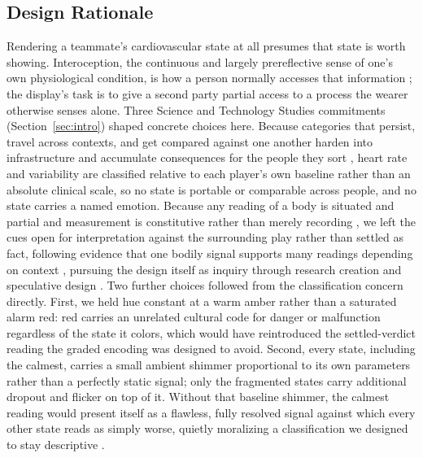 \documentclass[manuscript,review,anonymous]{acmart}
\begin{document}
\subsection{Design Rationale}
Rendering a teammate's cardiovascular state at all presumes that state is worth showing. Interoception, the continuous and largely prereflective sense of one's own physiological condition, is how a person normally accesses that information \cite{craig_how_2002}; the display's task is to give a second party partial access to a process the wearer otherwise senses alone. Three Science and Technology Studies commitments (Section~\ref{sec:intro}) shaped concrete choices here. Because categories that persist, travel across contexts, and get compared against one another harden into infrastructure and accumulate consequences for the people they sort \cite{bowker_sorting_2008}, heart rate and variability are classified relative to each player's own baseline rather than an absolute clinical scale, so no state is portable or comparable across people, and no state carries a named emotion. Because any reading of a body is situated and partial \cite{haraway_situated_1988} and measurement is constitutive rather than merely recording \cite{barad_meeting_1996}, we left the cues open for interpretation against the surrounding play rather than settled as fact, following evidence that one bodily signal supports many readings depending on context \cite{howell_biosignals_2016}, pursuing the design itself as inquiry through research creation \cite{amos_kyriaki_2015} and speculative design \cite{wakkary_things_2021}. Two further choices followed from the classification concern directly. First, we held hue constant at a warm amber rather than a saturated alarm red: red carries an unrelated cultural code for danger or malfunction regardless of the state it colors, which would have reintroduced the settled-verdict reading the graded encoding was designed to avoid. Second, every state, including the calmest, carries a small ambient shimmer proportional to its own parameters rather than a perfectly static signal; only the fragmented states carry additional dropout and flicker on top of it. Without that baseline shimmer, the calmest reading would present itself as a flawless, fully resolved signal against which every other state reads as simply worse, quietly moralizing a classification we designed to stay descriptive \cite{bowker_sorting_2008}.
\end{document}
